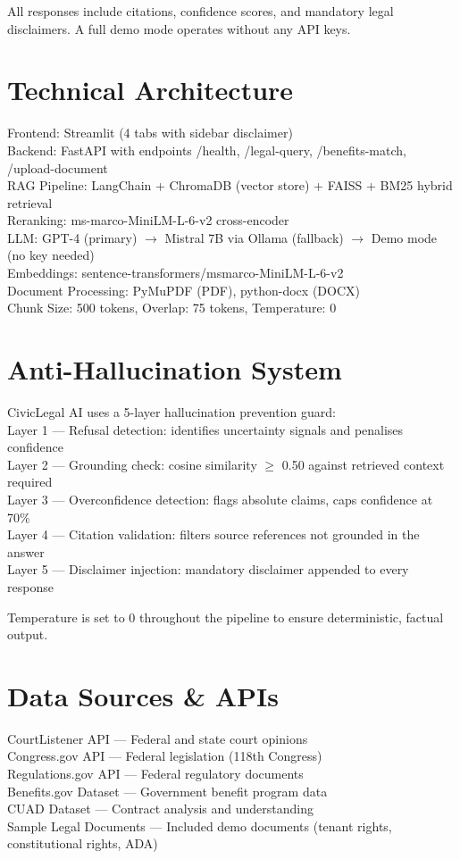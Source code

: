 \documentclass[12pt,a4paper]{article}
\begin{document}
All responses include citations, confidence scores, and mandatory legal disclaimers. A full demo mode operates without any API keys.

\section{Technical Architecture}
Frontend: Streamlit (4 tabs with sidebar disclaimer)\\Backend: FastAPI with endpoints /health, /legal-query, /benefits-match, /upload-document\\RAG Pipeline: LangChain + ChromaDB (vector store) + FAISS + BM25 hybrid retrieval\\Reranking: ms-marco-MiniLM-L-6-v2 cross-encoder\\LLM: GPT-4 (primary) $\rightarrow$ Mistral 7B via Ollama (fallback) $\rightarrow$ Demo mode (no key needed)\\Embeddings: sentence-transformers/msmarco-MiniLM-L-6-v2\\Document Processing: PyMuPDF (PDF), python-docx (DOCX)\\Chunk Size: 500 tokens, Overlap: 75 tokens, Temperature: 0

\section{Anti-Hallucination System}
CivicLegal AI uses a 5-layer hallucination prevention guard:\\Layer 1 — Refusal detection: identifies uncertainty signals and penalises confidence\\Layer 2 — Grounding check: cosine similarity $\geq$ 0.50 against retrieved context required\\Layer 3 — Overconfidence detection: flags absolute claims, caps confidence at 70\%\\Layer 4 — Citation validation: filters source references not grounded in the answer\\Layer 5 — Disclaimer injection: mandatory disclaimer appended to every response

Temperature is set to 0 throughout the pipeline to ensure deterministic, factual output.

\section{Data Sources \& APIs}
CourtListener API — Federal and state court opinions\\Congress.gov API — Federal legislation (118th Congress)\\Regulations.gov API — Federal regulatory documents\\Benefits.gov Dataset — Government benefit program data\\CUAD Dataset — Contract analysis and understanding\\Sample Legal Documents — Included demo documents (tenant rights, constitutional rights, ADA)
\end{document}
